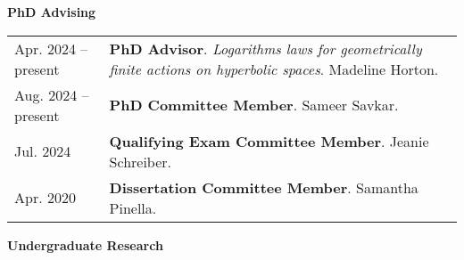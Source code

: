 
    \medskip


    \medskip
    \medskip



    \textbf{\large PhD Advising}
    
    \begin{center}
    {
    \renewcommand{\arraystretch}{1.5}
    \begin{longtable}{p{}  p{}}
     Apr.  2024 --    present & \textbf{PhD Advisor}. \textit{Logarithms laws for geometrically finite actions on hyperbolic spaces}.  Madeline Horton.  \\ 
 Aug.  2024 --    present & \textbf{PhD Committee Member}.  Sameer Savkar.  \\ 
 Jul.  2024 & \textbf{Qualifying Exam Committee Member}.  Jeanie Schreiber.  \\ 
 Apr.  2020 & \textbf{Dissertation Committee Member}.  Samantha Pinella.  
    \end{longtable}
    } 
    \end{center}

    \vspace{-1em}
    

    \textbf{\large Undergraduate Research}
    
